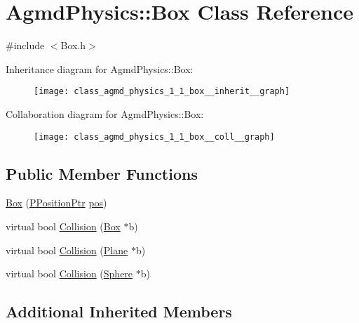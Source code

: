 \hypertarget{class_agmd_physics_1_1_box}{\section{Agmd\+Physics\+:\+:Box Class Reference}
\label{class_agmd_physics_1_1_box}
}


{\ttfamily \#include $<$Box.\+h$>$}



Inheritance diagram for Agmd\+Physics\+:\+:Box\+:\nopagebreak
\begin{figure}[H]
\begin{center}
\leavevmode
\texttt{[image: class\_agmd\_physics\_1\_1\_box\_\_inherit\_\_graph]}
\end{center}
\end{figure}


Collaboration diagram for Agmd\+Physics\+:\+:Box\+:\nopagebreak
\begin{figure}[H]
\begin{center}
\leavevmode
\texttt{[image: class\_agmd\_physics\_1\_1\_box\_\_coll\_\_graph]}
\end{center}
\end{figure}
\subsection*{Public Member Functions}
\begin{DoxyCompactItemize}
\item 
\hyperlink{class_agmd_physics_1_1_box_ab926976f2be5eb790c2470c0ca884026}{Box} (\hyperlink{namespace_agmd_physics_a72f849383bbb96be02fec5a53333d7fd}{P\+Position\+Ptr} \hyperlink{_examples_2_planet_2_app_8cpp_aa8a1c0491559faca4ebd0881575ae7f0}{pos})
\item 
virtual bool \hyperlink{class_agmd_physics_1_1_box_ae76f31773bb5c9e2d4a334611ad48ab0}{Collision} (\hyperlink{class_agmd_physics_1_1_box}{Box} $\ast$b)
\item 
virtual bool \hyperlink{class_agmd_physics_1_1_box_a3b3ff2d2dbd2ccf81c3161309d51ba8d}{Collision} (\hyperlink{class_agmd_physics_1_1_plane}{Plane} $\ast$b)
\item 
virtual bool \hyperlink{class_agmd_physics_1_1_box_a05ed735f901bd69a09805b58cd7a108c}{Collision} (\hyperlink{class_agmd_physics_1_1_sphere}{Sphere} $\ast$b)
\end{DoxyCompactItemize}
\subsection*{Additional Inherited Members}


